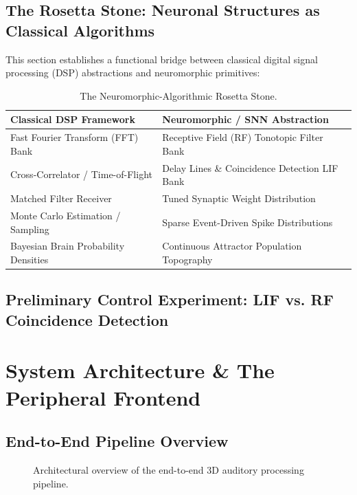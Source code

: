 \documentclass[12pt,a4paper]{report}
\begin{document}
\section{The Rosetta Stone: Neuronal Structures as Classical Algorithms}
This section establishes a functional bridge between classical digital signal processing (DSP) abstractions and neuromorphic primitives:
\begin{table}[htbp]
    \centering
    \caption{The Neuromorphic-Algorithmic Rosetta Stone.}
    \begin{tabular}{ll}
        \toprule
        \textbf{Classical DSP Framework} & \textbf{Neuromorphic / SNN Abstraction} \\
        \midrule
        Fast Fourier Transform (FFT) Bank & Receptive Field (RF) Tonotopic Filter Bank \\
        Cross-Correlator / Time-of-Flight & Delay Lines \& Coincidence Detection LIF Bank \\
        Matched Filter Receiver & Tuned Synaptic Weight Distribution \\
        Monte Carlo Estimation / Sampling & Sparse Event-Driven Spike Distributions \\
        Bayesian Brain Probability Densities & Continuous Attractor Population Topography \\
        \bottomrule
    \end{tabular}
    \label{tab:rosetta_stone}
\end{table}

\section{Preliminary Control Experiment: LIF vs. RF Coincidence Detection}

\chapter{System Architecture \& The Peripheral Frontend}
\label{ch:frontend}

\section{End-to-End Pipeline Overview}
\begin{figure}[htbp]
    \centering
    \caption{Architectural overview of the end-to-end 3D auditory processing pipeline.}
    \label{fig:system_overview}
\end{figure}
\end{document}
